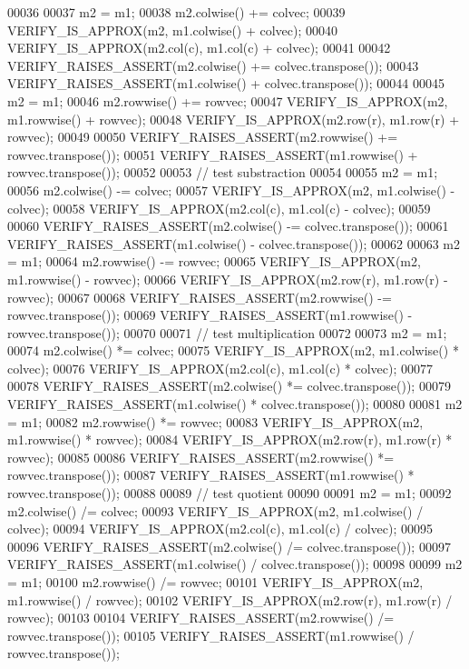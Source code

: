 \begin{DoxyCode}
00036 
00037   m2 = m1;
00038   m2.colwise() += colvec;
00039   VERIFY\_IS\_APPROX(m2, m1.colwise() + colvec);
00040   VERIFY\_IS\_APPROX(m2.col(c), m1.col(c) + colvec);
00041 
00042   VERIFY\_RAISES\_ASSERT(m2.colwise() += colvec.transpose());
00043   VERIFY\_RAISES\_ASSERT(m1.colwise() + colvec.transpose());
00044 
00045   m2 = m1;
00046   m2.rowwise() += rowvec;
00047   VERIFY\_IS\_APPROX(m2, m1.rowwise() + rowvec);
00048   VERIFY\_IS\_APPROX(m2.row(r), m1.row(r) + rowvec);
00049 
00050   VERIFY\_RAISES\_ASSERT(m2.rowwise() += rowvec.transpose());
00051   VERIFY\_RAISES\_ASSERT(m1.rowwise() + rowvec.transpose());
00052 
00053   \textcolor{comment}{// test substraction}
00054 
00055   m2 = m1;
00056   m2.colwise() -= colvec;
00057   VERIFY\_IS\_APPROX(m2, m1.colwise() - colvec);
00058   VERIFY\_IS\_APPROX(m2.col(c), m1.col(c) - colvec);
00059 
00060   VERIFY\_RAISES\_ASSERT(m2.colwise() -= colvec.transpose());
00061   VERIFY\_RAISES\_ASSERT(m1.colwise() - colvec.transpose());
00062 
00063   m2 = m1;
00064   m2.rowwise() -= rowvec;
00065   VERIFY\_IS\_APPROX(m2, m1.rowwise() - rowvec);
00066   VERIFY\_IS\_APPROX(m2.row(r), m1.row(r) - rowvec);
00067 
00068   VERIFY\_RAISES\_ASSERT(m2.rowwise() -= rowvec.transpose());
00069   VERIFY\_RAISES\_ASSERT(m1.rowwise() - rowvec.transpose());
00070 
00071   \textcolor{comment}{// test multiplication}
00072 
00073   m2 = m1;
00074   m2.colwise() *= colvec;
00075   VERIFY\_IS\_APPROX(m2, m1.colwise() * colvec);
00076   VERIFY\_IS\_APPROX(m2.col(c), m1.col(c) * colvec);
00077 
00078   VERIFY\_RAISES\_ASSERT(m2.colwise() *= colvec.transpose());
00079   VERIFY\_RAISES\_ASSERT(m1.colwise() * colvec.transpose());
00080 
00081   m2 = m1;
00082   m2.rowwise() *= rowvec;
00083   VERIFY\_IS\_APPROX(m2, m1.rowwise() * rowvec);
00084   VERIFY\_IS\_APPROX(m2.row(r), m1.row(r) * rowvec);
00085 
00086   VERIFY\_RAISES\_ASSERT(m2.rowwise() *= rowvec.transpose());
00087   VERIFY\_RAISES\_ASSERT(m1.rowwise() * rowvec.transpose());
00088 
00089   \textcolor{comment}{// test quotient}
00090 
00091   m2 = m1;
00092   m2.colwise() /= colvec;
00093   VERIFY\_IS\_APPROX(m2, m1.colwise() / colvec);
00094   VERIFY\_IS\_APPROX(m2.col(c), m1.col(c) / colvec);
00095 
00096   VERIFY\_RAISES\_ASSERT(m2.colwise() /= colvec.transpose());
00097   VERIFY\_RAISES\_ASSERT(m1.colwise() / colvec.transpose());
00098 
00099   m2 = m1;
00100   m2.rowwise() /= rowvec;
00101   VERIFY\_IS\_APPROX(m2, m1.rowwise() / rowvec);
00102   VERIFY\_IS\_APPROX(m2.row(r), m1.row(r) / rowvec);
00103 
00104   VERIFY\_RAISES\_ASSERT(m2.rowwise() /= rowvec.transpose());
00105   VERIFY\_RAISES\_ASSERT(m1.rowwise() / rowvec.transpose());

\end{DoxyCode}

